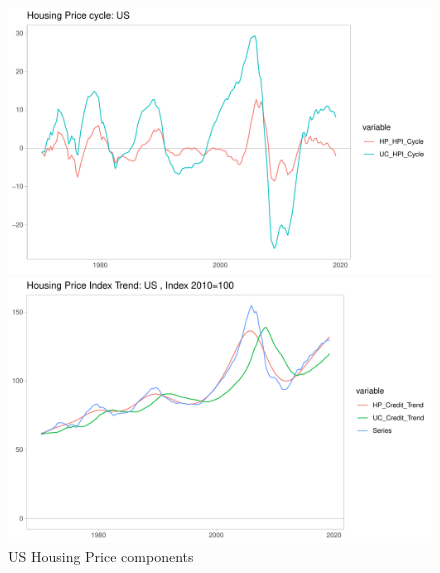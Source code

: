 \documentclass[fleqn]{article}
\begin{document}
\begin{outline}[enumerate]
\begin{figure}[h!]
\caption{US Housing Price components}	
\centerline{\includegraphics[scale=0.7]{../Output/Graphs/HP_cycle_US.pdf}}
\centerline{\includegraphics[scale=0.7]{../Output/Graphs/HP_trend_US.pdf}}
\end{figure}


\end{outline}
\end{document}

